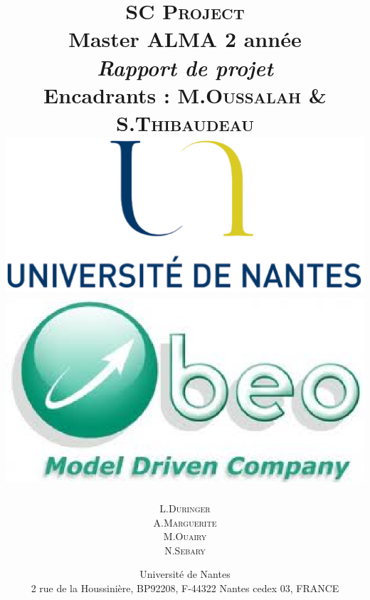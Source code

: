 \documentclass{report}
\title{ {\huge \textsc{SC Project}} \\Master ALMA 2\up{eme} année \\\vspace{1cm} \emph{Rapport de projet} \\ {\small Encadrants : M.\textsc{Oussalah} \& S.\textsc{Thibaudeau}} \\\vspace{2cm}\includegraphics[scale=0.17]{img/logouniv} \hspace{1cm}\includegraphics[scale=0.35]{img/logoobeo}\vspace{1.5cm}}
\author{L.\textsc{Duringer} \\  A.\textsc{Marguerite}\\ M.\textsc{Ouairy}\\ N.\textsc{Sebary} \\  \vspace{1cm}}
\date{Université de Nantes \\ 2 rue de la Houssinière, BP92208, F-44322 Nantes cedex 03, FRANCE}
\newcommand{\inputnp}[1]{\newpage}
\begin{document}
\maketitle
\renewcommand{\labelitemi}{$\bullet$} 

\clearpage

\tableofcontents
\clearpage

%
\inputnp{1_Introduction}
\inputnp{2_Objectifs}
\inputnp{3_Methodologie} 
\inputnp{4_Travaux}
\inputnp{5_Bilan}


\listoffigures
%
%
\end{document}
